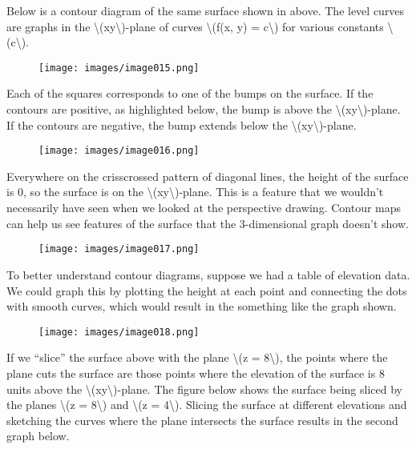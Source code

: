 Below is a contour diagram of the same surface shown in above. The level
curves are graphs in the \textbackslash{}(xy\textbackslash{})-plane of
curves \textbackslash{}(f(x, y) = c\textbackslash{}) for various
constants \textbackslash{}(c\textbackslash{}).

\begin{figure}
\centering
\texttt{[image: images/image015.png]}
\caption{}
\end{figure}

Each of the squares corresponds to one of the bumps on the surface. If
the contours are positive, as highlighted below, the bump is above the
\textbackslash{}(xy\textbackslash{})-plane. If the contours are
negative, the bump extends below the
\textbackslash{}(xy\textbackslash{})-plane.

\begin{figure}
\centering
\texttt{[image: images/image016.png]}
\caption{}
\end{figure}

Everywhere on the crisscrossed pattern of diagonal lines, the height of
the surface is 0, so the surface is on the
\textbackslash{}(xy\textbackslash{})-plane. This is a feature that we
wouldn't necessarily have seen when we looked at the perspective
drawing. Contour maps can help us see features of the surface that the
3-dimensional graph doesn't show.

\begin{figure}
\centering
\texttt{[image: images/image017.png]}
\caption{}
\end{figure}

To better understand contour diagrams, suppose we had a table of
elevation data. We could graph this by plotting the height at each point
and connecting the dots with smooth curves, which would result in the
something like the graph shown.

\begin{figure}
\centering
\texttt{[image: images/image018.png]}
\caption{}
\end{figure}

If we ``slice'' the surface above with the plane \textbackslash{}(z =
8\textbackslash{}), the points where the plane cuts the surface are
those points where the elevation of the surface is 8 units above the
\textbackslash{}(xy\textbackslash{})-plane. The figure below shows the
surface being sliced by the planes \textbackslash{}(z =
8\textbackslash{}) and \textbackslash{}(z = 4\textbackslash{}). Slicing
the surface at different elevations and sketching the curves where the
plane intersects the surface results in the second graph below.

